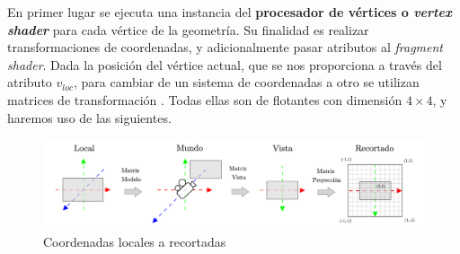 En primer lugar se ejecuta una instancia del \textbf{procesador de vértices o \textit{vertex shader}} para cada vértice de la geometría. Su finalidad es realizar transformaciones de coordenadas, y adicionalmente pasar atributos al \textit{fragment shader}. Dada la posición del vértice actual, que se nos proporciona a través del atributo $v_{loc}$, para cambiar de un sistema de coordenadas a otro se utilizan matrices de transformación \cite{article:matrices} \cite{article:matrices2}. Todas ellas son de flotantes con dimensión $4\times 4$, y haremos uso de las siguientes.
\begin{figure}[h]
    \centering
    \includegraphics[width=\textwidth]{Plantilla-TFG-master/img/matrices2.png}
    \caption{Coordenadas locales a recortadas}
    \label{fig:matrices}
\end{figure}
